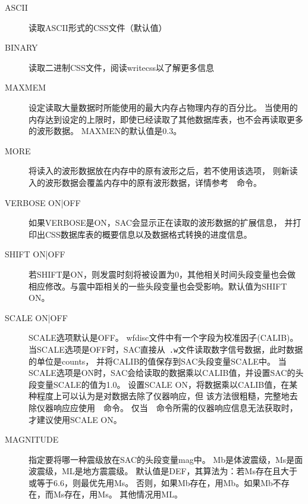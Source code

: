 \begin{description}
\item [ASCII] 读取ASCII形式的CSS文件（默认值）
\item [BINARY] 读取二进制CSS文件，阅读writecss以了解更多信息
\item [MAXMEM] 设定读取大量数据时所能使用的最大内存占物理内存的百分比。
    当使用的内存达到设定的上限时，即使已经读取了其他数据库表，也不会再读取更多的波形数据。
    MAXMEN的默认值是0.3。
\item [MORE] 将读入的波形数据放在内存中的原有波形之后，若不使用该选项，
    则新读入的波形数据会覆盖内存中的原有波形数据，详情参考~~命令。
\item [VERBOSE ON|OFF] 如果VERBOSE是ON，SAC会显示正在读取的波形数据的扩展信息，
    并打印出CSS数据库表的概要信息以及数据格式转换的进度信息。
\item [SHIFT ON|OFF] 若SHIFT是ON，则发震时刻将被设置为0，其他相关时间头段变量也会做
    相应修改。与震中距相关的一些头段变量也会受影响。默认值为SHIFT ON。
\item [SCALE ON|OFF] SCALE选项默认是OFF。
    wfdisc文件中有一个字段为校准因子(CALIB)。
    当SCALE选项是OFF时，SAC直接从~\verb+.w+文件读取数字信号数据，此时数据的单位是counts，
    并将CALIB的值保存到SAC头段变量SCALE中。
    当SCALE选项是ON时，SAC会给读取的数据乘以CALIB值，并设置SAC的头段变量SCALE的值为1.0。
    设置SCALE ON，将数据乘以CALIB值，在某种程度上可以认为是对数据去除了仪器响应，但
    该方法很粗糙，完整地去除仪器响应应使用~~命令。
    仅当~~命令所需的仪器响应信息无法获取时，才建议使用SCALE ON。
\item [MAGNITUDE] 指定要将哪一种震级放在SAC的头段变量mag中。
    Mb是体波震级，Ms是面波震级，ML是地方震震级。
    默认值是DEF，其算法为：若Ms存在且大于或等于6.6，则最优先用Ms。
    否则，如果Mb存在，用Mb。如果Mb不存在，而Ms存在，用Ms。
    其他情况用ML。

\end{description}
